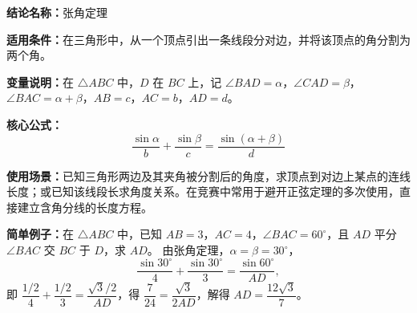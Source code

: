 \textbf{结论名称：}张角定理

\textbf{适用条件：}在三角形中，从一个顶点引出一条线段分对边，并将该顶点的角分割为两个角。

\textbf{变量说明：}在 $\triangle ABC$ 中，$D$ 在 $BC$ 上，记 $\angle BAD=\alpha$，$\angle CAD=\beta$，$\angle BAC=\alpha+\beta$，$AB=c$，$AC=b$，$AD=d$。

\textbf{核心公式：}
\[
\boxed{\frac{\sin\alpha}{b}+\frac{\sin\beta}{c}=\frac{\sin(\alpha+\beta)}{d}}
\]

\textbf{使用场景：}已知三角形两边及其夹角被分割后的角度，求顶点到对边上某点的连线长度；或已知该线段长求角度关系。在竞赛中常用于避开正弦定理的多次使用，直接建立含角分线的长度方程。

\textbf{简单例子：}在 $\triangle ABC$ 中，已知 $AB=3$，$AC=4$，$\angle BAC=60^\circ$，且 $AD$ 平分 $\angle BAC$ 交 $BC$ 于 $D$，求 $AD$。
由张角定理，$\alpha=\beta=30^\circ$，
\[
\frac{\sin 30^\circ}{4}+\frac{\sin 30^\circ}{3}= \frac{\sin 60^\circ}{AD},
\]
即 $\dfrac{1/2}{4}+\dfrac{1/2}{3} = \dfrac{\sqrt3/2}{AD}$，得 $\dfrac{7}{24}= \dfrac{\sqrt3}{2AD}$，解得 $AD=\dfrac{12\sqrt3}{7}$。